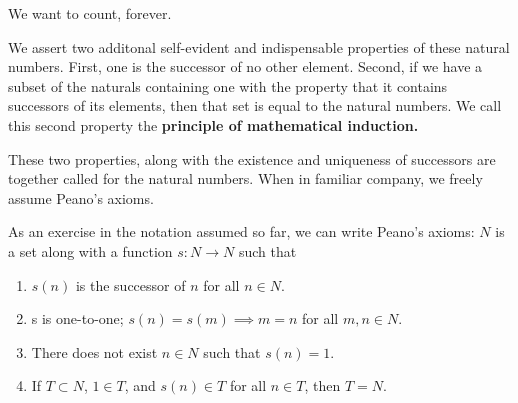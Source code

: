 
\sbasic













\sstart
{}


We want to count, forever.


We assert two additonal self-evident and indispensable properties of these natural numbers.
First, one is the successor of no other element.
Second, if we have a subset of the naturals containing one with the property that it contains successors of its elements, then that set is equal to the natural numbers.
We call this second property the \textbf{principle of mathematical induction.}

These two properties, along with the existence
and uniqueness of successors are together called
 for the natural numbers.
When in familiar company, we freely assume Peano's axioms.


As an exercise in the notation assumed so far, we can write Peano's axioms: $N$ is a set along with a function $s: N \to N$ such that
\begin{enumerate}
  \item $s(n)$ is the successor of $n$ for all $n \in N$.
  \item s is one-to-one; $s(n) = s(m) \implies m = n$  for all $m, n \in N$.
  \item There does not exist $n \in N$ such that $s(n) = 1$.
  \item If $T \subset N$, $1 \in T$, and $s(n) \in T$ for all $n \in T$, then $T = N$.
\end{enumerate}
\strats

